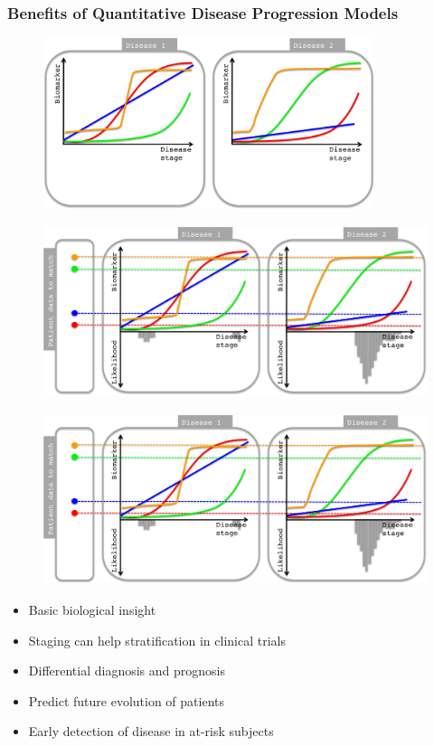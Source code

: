 \documentclass[8pt,xcolor=table]{beamer}
\begin{document}
\begin{frame}
\frametitle{Benefits of Quantitative Disease Progression Models}

\begin{overprint}
 \begin{figure}
 \centering
\includegraphics[height=5cm,trim=0 0 650 0,clip]{../dpmDiffDiag1.png}
\end{figure}

 \begin{figure}
 \centering
\includegraphics[height=5cm,trim=0 0 650 0,clip]{../dpmDiffDiag2.png}
\end{figure}

 \begin{figure}
 \centering
\includegraphics[height=5cm,trim=0 0 0 0,clip]{../dpmDiffDiag2.png}
\end{figure}

\end{overprint}

\vspace{1em}
\begin{itemize}
  \item Basic biological insight
  \item Staging can help stratification in clinical trials
  \item Differential diagnosis and prognosis
  \item Predict future evolution of patients
  \item Early detection of disease in at-risk subjects
 

\end{itemize}
\end{frame}
\end{document}
